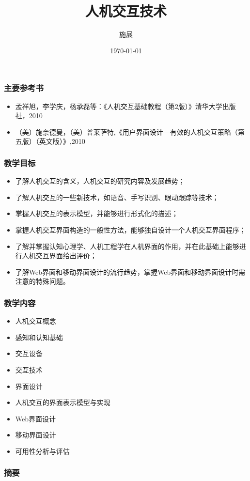 \documentclass{beamer}
\title{人机交互技术}
\author{施展}
\institute{华中科技大学~武汉光电国家实验室}
\date{\today}
\begin{document}
\begin{frame}
	\titlepage
\end{frame}

\begin{frame}
	\frametitle{主要参考书}
	\begin{itemize}[<+-|alert@+>]
		\item 孟祥旭，李学庆，杨承磊等：《人机交互基础教程（第2版）》清华大学出版社，2010
		\item （美）施奈德曼，（美）普莱萨特,《用户界面设计—有效的人机交互策略（第五版）（英文版）》,2010
	\end{itemize}
\end{frame}

\begin{frame}
	\frametitle{教学目标}
	\begin{itemize}[<+-|alert@+>]
		\item 了解人机交互的含义，人机交互的研究内容及发展趋势；
		\item 了解人机交互的一些新技术，如语音、手写识别、眼动跟踪等技术；
		\item 掌握人机交互的表示模型，并能够进行形式化的描述；
		\item 掌握人机交互界面构造的一般性方法，能够独自设计一个人机交互界面程序；
		\item 了解并掌握认知心理学、人机工程学在人机界面的作用，并在此基础上能够进行人机交互界面给出评价；
		\item 了解Web界面和移动界面设计的流行趋势，掌握Web界面和移动界面设计时需注意的特殊问题。
	\end{itemize}
\end{frame}

\begin{frame}
	\frametitle{教学内容}
	\begin{itemize}[<+-|alert@+>]
		\item 人机交互概念
		\item 感知和认知基础
		\item 交互设备
		\item 交互技术
		\item 界面设计 
		\item 人机交互的界面表示模型与实现
		\item Web界面设计
		\item 移动界面设计
		\item 可用性分析与评估
	\end{itemize}
\end{frame}

\begin{frame}
	\frametitle{摘要}
	\tableofcontents
\end{frame}
  
\end{document}
